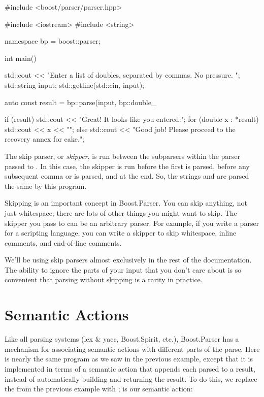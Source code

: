 \documentclass{MyBook}
\begin{document}
\begin{code}
#include <boost/parser/parser.hpp>

#include <iostream>
#include <string>


namespace bp = boost::parser;

int main()
{
    std::cout << "Enter a list of doubles, separated by commas.  No pressure. ";
    std::string input;
    std::getline(std::cin, input);

    auto const result = bp::parse(input, bp::double_ %

    if (result) {
        std::cout << "Great! It looks like you entered:\n";
        for (double x : *result) {
            std::cout << x << "\n";
        }
    } else {
        std::cout
            << "Good job!  Please proceed to the recovery annex for cake.\n";
    }
}
\end{code}

The skip parser, or \emph{skipper}, is run between the subparsers within the parser passed to . In this case, the skipper is run before the first  is parsed, before any subsequent comma or  is parsed, and at the end. So, the strings  and  are parsed the same by this program.

Skipping is an important concept in Boost.Parser. You can skip anything, not just whitespace; there are lots of other things you might want to skip. The skipper you pass to  can be an arbitrary parser. For example, if you write a parser for a scripting language, you can write a skipper to skip whitespace, inline comments, and end-of-line comments.

We'll be using skip parsers almost exclusively in the rest of the documentation. The ability to ignore the parts of your input that you don't care about is so convenient that parsing without skipping is a rarity in practice.

\section{Semantic Actions}

Like all parsing systems (lex \& yacc, Boost.Spirit, etc.), Boost.Parser has a mechanism for associating semantic actions with different parts of the parse. Here is nearly the same program as we saw in the previous example, except that it is implemented in terms of a semantic action that appends each parsed  to a result, instead of automatically building and returning the result. To do this, we replace the  from the previous example with ;  is our semantic action:
\end{document}
